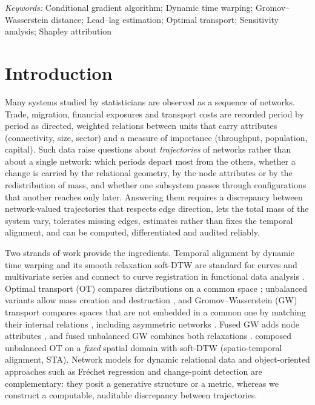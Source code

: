 \documentclass[12pt]{article}
\theoremstyle{definition}
\begin{document}
\noindent%
{\it Keywords:} Conditional gradient algorithm; Dynamic time warping; Gromov--Wasserstein distance; Lead--lag estimation; Optimal transport; Sensitivity analysis; Shapley attribution
\vfill

\newpage
{} %

\section{Introduction}
\label{sec:intro}

Many systems studied by statisticians are observed as a sequence of networks. Trade, migration, financial exposures and transport costs are recorded period by period as directed, weighted relations between units that carry attributes (connectivity, size, sector) and a measure of importance (throughput, population, capital). Such data raise questions about \emph{trajectories} of networks rather than about a single network: which periods depart most from the others, whether a change is carried by the relational geometry, by the node attributes or by the redistribution of mass, and whether one subsystem passes through configurations that another reaches only later. Answering them requires a discrepancy between network-valued trajectories that respects edge direction, lets the total mass of the system vary, tolerates missing edges, estimates rather than fixes the temporal alignment, and can be computed, differentiated and audited reliably.

Two strands of work provide the ingredients. Temporal alignment by dynamic time warping \citep[DTW;][]{sakoe1978dynamic} and its smooth relaxation soft-DTW \citep{cuturi2017soft} are standard for curves and multivariate series and connect to curve registration in functional data analysis \citep{wang1997alignment,ramsay2005functional,kneip2008combining,tang2008pairwise,marron2015functional}. Optimal transport (OT) compares distributions on a common space \citep{villani2009optimal,peyre2019computational,panaretos2019statistical}; unbalanced variants allow mass creation and destruction \citep{liero2018optimal,chizat2018scaling,chizat2018unbalanced}, and Gromov--Wasserstein (GW) transport compares spaces that are not embedded in a common one by matching their internal relations \citep{memoli2011gromov,peyre2016gromov}, including asymmetric networks \citep{chowdhury2019gromov}. Fused GW adds node attributes \citep{vayer2019optimal,vayer2020fused}, and fused unbalanced GW combines both relaxations \citep{sejourne2021unbalanced,thual2022aligning}. \citet{janati2020spatio} composed unbalanced OT on a \emph{fixed} spatial domain with soft-DTW (spatio-temporal alignment, STA). Network models for dynamic relational data \citep{hoff2002latent,sewell2015latent,matias2017statistical,kolaczyk2009statistical} and object-oriented approaches such as Fr\'echet regression and change-point detection \citep{petersen2019frechet,dubey2020frechet,chen2023wasserstein} are complementary: they posit a generative structure or a metric, whereas we construct a computable, auditable discrepancy between trajectories.
\end{document}
